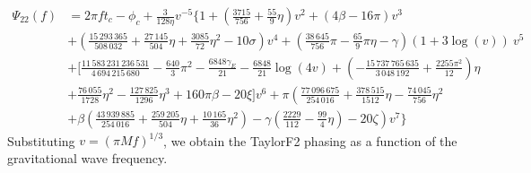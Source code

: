 %
{\footnotesize{\allowdisplaybreaks\begin{align}\label{eq:PsiSPA}
\Psi_{22}(f) &= 2\pi f t_c - \phi_c + \frac{3}{128\eta} v^{-5} \Bigg\{
1
+ \left( \frac{3715}{756} + \frac{55}{9} \eta \right) v^2 
+ ( 4 \beta - 16\pi ) v^3 \nonumber\\
&+ \left( \frac{15\,293\,365}{508\,032} + \frac{27\,145}{504} \eta + \frac{3085}{72} \eta^2 - 10\sigma \right) v^4
+ \left( \frac{38\,645}{756} \pi - \frac{65}{9}\pi\eta - \gamma \right) (1+3\log(v)) ~ v^5\nonumber\\
&+ \Bigg[ \frac{11\,583\,231\,236\,531}{4\,694\,215\,680} - \frac{640}{3}\pi^2 -\frac{6848\gamma_E}{21} -\frac{6848}{21} \log(4v)
+ \left( - \frac{15\,737\,765\,635}{3\,048\,192} + \frac{2255\pi^2}{12} \right) \eta \nonumber\\
&+ \frac{76\,055}{1728} \eta^2 - \frac{127\,825}{1296} \eta^3 + 160 \pi \beta - 20 \xi \Bigg] v^6 + \pi \left( \frac{77\,096\,675}{254\,016} + \frac{378\,515}{1512}\eta - \frac{74\,045}{756}\eta^2 
\right. \nonumber\\
 &+ \left. \beta \left( \frac{43\,939\,885}{254\,016} + \frac{259\,205}{504}\eta + \frac{10\,165}{36}\eta^2 \right) 
 - \gamma \left( \frac{2229}{112} - \frac{99}{4}\eta \right) - 20 \zeta \right) v^7  \Bigg\}
\end{align}}}
% 
Substituting $v=(\pi M f)^{1/3}$, we obtain the TaylorF2 phasing as a function
of the gravitational wave frequency.


